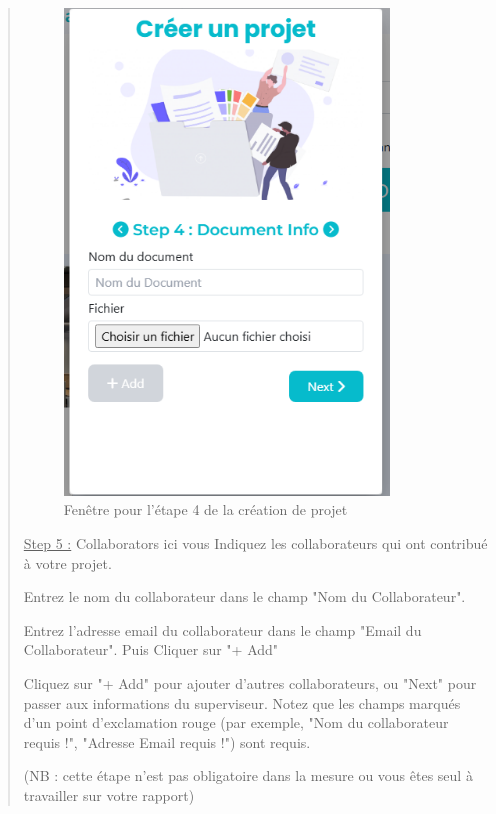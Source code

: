 \documentclass[a4paper,12pt]{article}
\begin{document}
\begin{quote}
\begin{figure}[H]
\centering
\includegraphics[width=0.85\textwidth]{IMAGES/etape4-projet.png}
\caption{Fenêtre pour l'étape 4 de la création de projet}
\label{fig:etape4projet}
\end{figure}

\underline{Step 5 :} Collaborators ici vous Indiquez les collaborateurs qui ont contribué à votre projet.

Entrez le nom du collaborateur dans le champ "Nom du Collaborateur".

Entrez l'adresse email du collaborateur dans le champ "Email du Collaborateur". Puis Cliquer sur "+ Add"

Cliquez sur "+ Add" pour ajouter d'autres collaborateurs, ou "Next" pour passer aux informations du superviseur. Notez que les champs marqués d'un point d'exclamation rouge (par exemple, "Nom du collaborateur requis !", "Adresse Email requis !") sont requis.

(NB : cette étape n’est pas obligatoire dans la mesure ou vous êtes seul à travailler sur votre rapport)


\end{quote}
\end{document}
